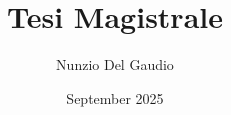 \documentclass[a4paper, 12pt, oneside]{book}
\title{Tesi Magistrale}
\author{Nunzio Del Gaudio}
\date{September 2025}
\begin{document}
\justifying



\tableofcontents







\clearpage
\printbibliography
\end{document}
